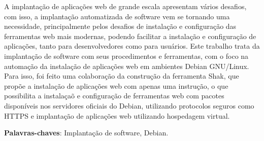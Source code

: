 \begin{resumo}

A implantação de aplicações web de grande escala apresentam vários desafios, com
isso, a implantação automatizada de software vem se tornando uma necessidade,
principalmente pelos desafios de instalação e configuração das ferramentas web
mais modernas, podendo facilitar a instalação e configuração de aplicações, tanto para
desenvolvedores como para usuários. Este trabalho trata da implantação de software
com seus procedimentos e ferramentas, com o foco na automação da instalação de 
aplicações web em ambientes Debian GNU/Linux. Para isso, foi feito uma colaboração da
construção da ferramenta Shak, que propõe a instalação de aplicações web com
apenas uma instrução, o que possibilita a instalaçaõ e configuração de ferramentas
web com pacotes disponíveis nos servidores oficiais do Debian, utilizando
protocolos seguros como HTTPS e implantação de aplicações web utilizando hospedagem virtual.
 \vspace{\onelineskip}

 \noindent
 \textbf{Palavras-chaves}: Implantação de software, Debian.
\end{resumo}
